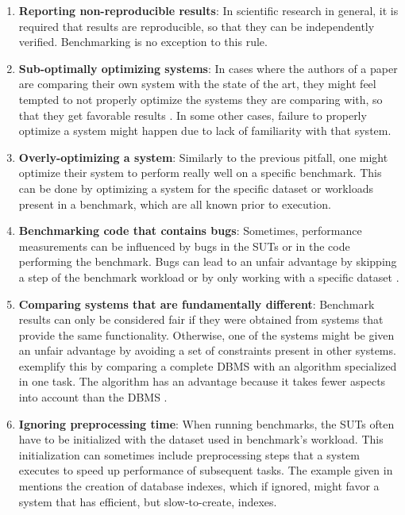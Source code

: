 \begin{enumerate}
	\item \textbf{Reporting non-reproducible results}: In scientific research in general, it is required that results are reproducible, so that they can be independently verified. Benchmarking is no exception to this rule.
	
	\item \textbf{Sub-optimally optimizing systems}: In cases where the authors of a paper are comparing their own system with the state of the art, they might feel tempted to not properly optimize the systems they are comparing with, so that they get favorable results \cite{raasveldtFairBenchmarkingConsidered2018}. In some other cases, failure to properly optimize a system might happen due to lack of familiarity with that system.
	
	\item \textbf{Overly-optimizing a system}: Similarly to the previous pitfall, one might optimize their system to perform really well on a specific benchmark. This can be done by optimizing a system for the specific dataset or workloads present in a benchmark, which are all known prior to execution.
	 
	\item \textbf{Benchmarking code that contains bugs}: Sometimes, performance measurements can be influenced by bugs in the SUTs or in the code performing the benchmark. Bugs can lead to an unfair advantage by skipping a step of the benchmark workload or by only working with a specific dataset \cite{raasveldtFairBenchmarkingConsidered2018}.
	
	 
	\item \textbf{Comparing systems that are fundamentally different}: Benchmark results can only be considered fair if they were obtained from systems that provide the same functionality. Otherwise, one of the systems might be given an unfair advantage by avoiding a set of constraints present in other systems. \citeauthor{raasveldtFairBenchmarkingConsidered2018} \cite{raasveldtFairBenchmarkingConsidered2018} exemplify this by comparing a complete DBMS with an algorithm specialized in one task. The algorithm has an advantage because it takes fewer aspects into account than the DBMS \cite{raasveldtFairBenchmarkingConsidered2018}.
	
	\item \textbf{Ignoring preprocessing time}: When running benchmarks, the SUTs often have to be initialized with the dataset used in benchmark's workload. This initialization can sometimes include preprocessing steps that a system executes to speed up performance of subsequent tasks. The example given in \cite{raasveldtFairBenchmarkingConsidered2018} mentions the creation of database indexes, which if ignored, might favor a system that has efficient, but slow-to-create, indexes.
	

\end{enumerate}
